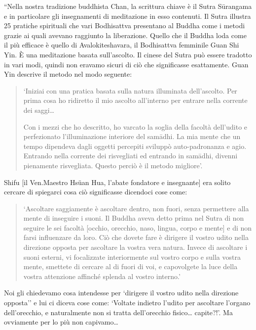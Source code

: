 ``Nella nostra tradizione buddhista Chan, la scrittura chiave è il Sutra
Sūrangama e in particolare gli insegnamenti di meditazione in esso
contenuti. Il Sutra illustra 25 pratiche spirituali che vari Bodhisattva
presentano al Buddha come i metodi grazie ai quali avevano raggiunto la
liberazione. Quello che il Buddha loda come il più efficace è quello di
Avalokiteshavara, il Bodhisattva femminile Guan Shi Yin. È una
meditazione basata sull'ascolto. Il cinese del Sutra può essere tradotto
in vari modi, quindi non eravamo sicuri di ciò che significasse
esattamente. Guan Yin descrive il metodo nel modo seguente:

\begin{quotation}
`Iniziai con una pratica basata sulla natura illuminata dell'ascolto.
Per prima cosa ho ridiretto il mio ascolto all'interno per entrare nella
corrente dei saggi\ldots{}

Con i mezzi che ho descritto, ho varcato la soglia della facoltà
dell'udito e perfezionato l'illuminazione interiore del samādhi. La mia
mente che un tempo dipendeva dagli oggetti percepiti sviluppò
auto-padronanza e agio. Entrando nella corrente dei risvegliati ed
entrando in samādhi, divenni pienamente risvegliata. Questo perciò è il
metodo migliore'.\cite{surangama}
\end{quotation}

Shifu [il Ven.Maestro Hsüan Hua, l'abate fondatore e insegnante] era
solito cercare di spiegarci cosa ciò significasse dicendoci cose come:

\begin{quotation}
`Ascoltare saggiamente è ascoltare dentro, non fuori, senza permettere
alla mente di inseguire i suoni. Il Buddha aveva detto prima nel Sutra
di non seguire le sei facoltà [occhio, orecchio, naso, lingua, corpo e
mente] e di non farsi influenzare da loro. Ciò che dovete fare è
dirigere il vostro udito nella direzione opposta per ascoltare la vostra
vera natura. Invece di ascoltare i suoni esterni, vi focalizzate
interiormente sul vostro corpo e sulla vostra mente, smettete di cercare
al di fuori di voi, e capovolgete la luce della vostra attenzione
affinché splenda al vostro interno.'\cite{surangama}
\end{quotation}

Noi gli chiedevamo cosa intendesse per `dirigere il vostro udito nella
direzione opposta'' e lui ci diceva cose come: `Voltate indietro l'udito
per ascoltare l'organo dell'orecchio, e naturalmente non si tratta
dell'orecchio fisico\ldots{} capite?!'. Ma ovviamente per lo più non
capivamo\ldots{}

